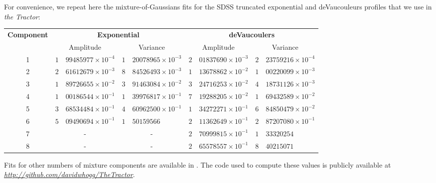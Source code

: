 \documentclass[11pt,preprint]{aastex}
\newcommand{\niceurl}[1]{\href{#1}{\textsl{#1}}}
\newcommand{\project}[1]{\textsl{#1}}
\begin{document}

For convenience, we repeat here the mixture-of-Gaussians fits for the
SDSS truncated exponential and deVaucouleurs profiles that we use in
\project{the Tractor}:
\begin{center}
\begin{tabular}{cr@{.}lr@{.}lr@{.}lr@{.}l}
\hline
\textbf{Component} &
\multicolumn{4}{c}{\textbf{Exponential}} & 
\multicolumn{4}{c}{\textbf{deVaucoulers}} \\
& \multicolumn{2}{c}{Amplitude}
& \multicolumn{2}{c}{Variance}
& \multicolumn{2}{c}{Amplitude}
& \multicolumn{2}{c}{Variance} \\
\hline
1 & 
$1$ & $99485977 \times 10^{-4}$
&
$1$ & $20078965 \times 10^{-3}$
&
$2$ & $01837690 \times 10^{-3}$
&
$2$ & $23759216 \times 10^{-4}$
\\
%
2 &
$2$ & $61612679 \times 10^{-3}$
&
$8$ & $84526493 \times 10^{-3}$
&
$1$ & $13678862 \times 10^{-2}$
&
$1$ & $00220099 \times 10^{-3}$
\\
%
3 &
$1$ & $89726655 \times 10^{-2}$
&
$3$ & $91463084 \times 10^{-2}$
&
$3$ & $24716253 \times 10^{-2}$
&
$4$ & $18731126 \times 10^{-3}$
\\
%
4 &
$1$ & $00186544 \times 10^{-1}$
&
$1$ & $39976817 \times 10^{-1}$
&
$7$ & $19288205 \times 10^{-2}$
&
$1$ & $69432589 \times 10^{-2}$
\\
%
5 &
$3$ & $68534484 \times 10^{-1}$
&
$4$ & $60962500 \times 10^{-1}$
&
$1$ & $34272271 \times 10^{-1}$
&
$6$ & $84850479 \times 10^{-2}$
\\
%
6 &
$5$ & $09490694 \times 10^{-1}$
&
$1$ & $50159566$
&
$2$ & $11362649 \times 10^{-1}$
&
$2$ & $87207080 \times 10^{-1}$
\\
%
7 &
\multicolumn{2}{c}{-} &
\multicolumn{2}{c}{-} &
$2$ & $70999815 \times 10^{-1}$
&
$1$ & $33320254$
\\
%
8 &
\multicolumn{2}{c}{-} &
\multicolumn{2}{c}{-} &
$2$ & $65578557 \times 10^{-1}$
&
$8$ & $40215071$
\\
\hline
\end{tabular}
\end{center}
Fits for other numbers of mixture components are available in
\cite{moggalaxy}.  The code used to compute these values is publicly
available at \niceurl{http://github.com/davidwhogg/TheTractor}.
\end{document}
